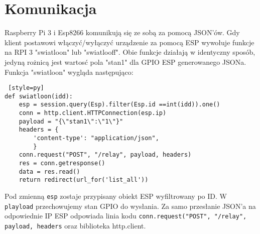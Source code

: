 \documentclass{xmgr}
\begin{document}
\section{Komunikacja}
Raspberry Pi 3 i Esp8266 komunikują się ze sobą za pomocą JSON'ów. Gdy klient postawowi włączyć/wyłączyć urządzenie za pomocą ESP wywołuje funkcje na RPI 3 "swiatloon" lub "swiatlooff". Obie funkcje działają w identyczny sposób,  jedyną rożnicą jest wartosć pola "stan1" dla GPIO ESP generowanego JSONa. Funkcja "swiatloon" wygląda następująco:
\begin{lstlisting} [style=py] 
def swiatloon(idd):
    esp = session.query(Esp).filter(Esp.id ==int(idd)).one()
    conn = http.client.HTTPConnection(esp.ip)
    payload = "{\"stan1\":\"1\"}"
    headers = {
        'content-type': "application/json",
        }
    conn.request("POST", "/relay", payload, headers)
    res = conn.getresponse()
    data = res.read()
    return redirect(url_for('list_all'))
\end{lstlisting}
Pod zmienną \texttt{esp} zostaje przypisany obiekt ESP wyfiltrowany po ID. W \texttt{playload} przechowujemy stan GPIO do wysłania. Za samo przesłanie JSON'a na odpowiednie IP ESP odpowiada linia kodu \texttt{conn.request("POST", "/relay", payload, headers} oraz biblioteka http.client. 
\end{document}
